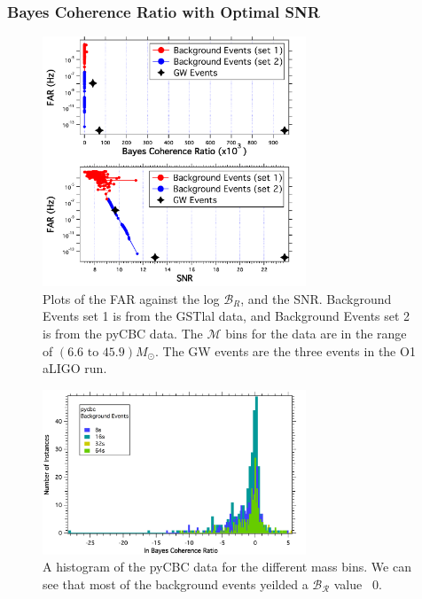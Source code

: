 \documentclass{article}
\begin{document}
 
 
 
 \subsubsection{Bayes Coherence Ratio with Optimal SNR}
 
  
  \begin{figure}[h]
  	\centering
  	\includegraphics[width=0.7\textwidth]{Figures/eventsOnBackground.pdf} 
  	\caption{Plots of the FAR against the log $\mathcal{B}_{R}$, and the SNR. Background Events set 1 is from the GSTlal data, and Background Events set 2 is from the pyCBC data.  The $\mathcal{M}$ bins for the data are in the range of $(6.6  \text{ to } 45.9) M_{\odot}$. The GW events are the three events in the O1 aLIGO run.}
  	\label{Fig:eventsOnBackgroundFINAL}
  \end{figure}
  
 
    
    \begin{figure}[h]
    	\centering
    	\includegraphics[width=0.7\textwidth]{Figures/lnBCRhistogram.png} 
    	\caption{A histogram of the pyCBC data for the different mass bins. We can see that most of the background events yeilded a $\mathcal{B_R}$ value ~0.}
    	\label{Fig:histogramBCR}
    \end{figure}
    
\end{document}
